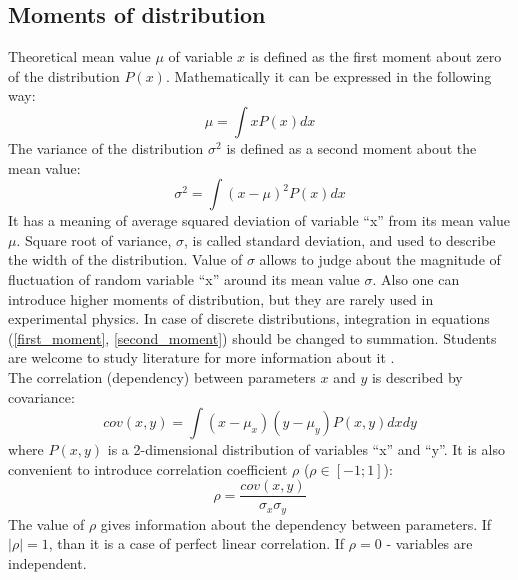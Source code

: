 \documentclass[12pt,a4paper]{report}
\begin{document}
\subsection{Moments of distribution}
Theoretical mean value $\mu$ of variable $x$ is defined as the first moment about zero of the distribution $P(x)$. Mathematically it can be expressed in the following way:
\begin{equation} \label{first_moment}
\mu = \int x P(x) dx
\end{equation}
The variance of the distribution $\sigma^2$ is defined as a second moment about the mean value:
\begin{equation} \label{second_moment}
\sigma^2 = \int (x-\mu)^2P(x)dx
\end{equation}
It has a meaning of average squared deviation of variable \enquote{x} from its mean value $\mu$. Square root of variance, $\sigma$, is called standard deviation, and used to describe the width of the distribution. Value of $\sigma$ allows to judge about the magnitude of fluctuation of random variable \enquote{x} around its mean value $\sigma$. Also one can introduce higher moments of distribution, but they are rarely used in experimental physics. In case of discrete distributions, integration in equations (\ref{first_moment}, \ref{second_moment}) should be changed to summation. Students are welcome to study literature for more information about it \cite{stat_1, stat_2, stat_3}. \\
The correlation (dependency) between parameters $x$ and $y$ is described by covariance:
\begin{equation} \label{cov}
cov(x,y) = \int (x-\mu_x)(y-\mu_y)P(x,y)dxdy
\end{equation}
where $P(x,y)$ is a 2-dimensional distribution of variables \enquote{x} and \enquote{y}. It is also convenient to introduce correlation coefficient $\rho$ ($\rho \in [-1; 1]$):
\begin{equation} \label{rho}
\rho = \frac{cov(x,y)}{\sigma_x \sigma_y}
\end{equation}
The value of $\rho$ gives information about the dependency between parameters. If $|\rho| = 1$, than it is a case of perfect linear correlation. If $\rho = 0$ - variables are independent.
\end{document}
